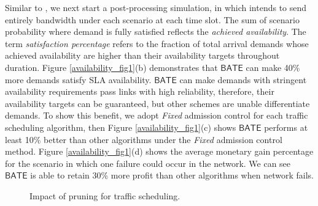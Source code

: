 \documentclass[sigconf]{acmart}
\begin{document}
Similar to \cite{Teavar}, we next start a post-processing simulation, in which intends to send entirely bandwidth under each scenario at each time slot.
The sum of scenario probability where demand is fully satisfied reflects the \textit{achieved availability}.
The term \textit{satisfaction percentage} refers to the fraction of total arrival demands whose achieved availability are higher than their availability targets throughout duration.
Figure \ref{availability_fig1}(b) demonstrates that $\mathsf{BATE}$ can make 40\% more demands satisfy SLA availability.
$\mathsf{BATE}$ can make demands with stringent availability requirements pass links with high reliability, therefore, their availability targets can be guaranteed, but other schemes are unable differentiate demands.
To show this benefit, we adopt \textit{Fixed} admission control for each traffic scheduling algorithm, then Figure \ref{availability_fig1}(c) shows $\mathsf{BATE}$ performs at least 10\% better than other algorithms under the \textit{Fixed} admission control method.
Figure \ref{availability_fig1}(d) shows the average monetary gain percentage for the scenario in which one failure could occur in the network.
We can see $\mathsf{BATE}$  is able to retain 30\% more profit than other algorithms when network fails.
\begin{figure}
\centering
{}
\caption{Impact of pruning for traffic scheduling.}
\label{availability_fig3}
\end{figure}
\end{document}
